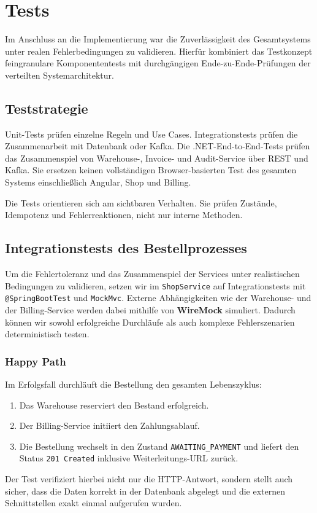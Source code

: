 \documentclass[
  11pt,
  a4paper,
  oneside,
  headings=normal,
  parskip=half,
  DIV=12
]{scrreprt}
\begin{document}
\chapter{Tests}

Im Anschluss an die Implementierung war die Zuverlässigkeit des Gesamtsystems unter realen Fehlerbedingungen zu validieren. Hierfür kombiniert das Testkonzept feingranulare Komponententests mit durchgängigen Ende-zu-Ende-Prüfungen der verteilten Systemarchitektur.

\section{Teststrategie}

Unit-Tests prüfen einzelne Regeln und Use Cases. Integrationstests prüfen die
Zusammenarbeit mit Datenbank oder Kafka. Die .NET-End-to-End-Tests prüfen das Zusammenspiel von Warehouse-, Invoice- und Audit-Service über REST und Kafka. Sie ersetzen keinen vollständigen Browser-basierten Test des gesamten Systems einschließlich Angular, Shop und Billing.

Die Tests orientieren sich am sichtbaren Verhalten. Sie prüfen Zustände,
Idempotenz und Fehlerreaktionen, nicht nur interne Methoden.

\section{Integrationstests des Bestellprozesses}

Um die Fehlertoleranz und das Zusammenspiel der Services unter realistischen Bedingungen zu validieren, setzen wir im \texttt{ShopService} auf Integrationstests mit \texttt{@SpringBootTest} und \texttt{MockMvc}. Externe Abhängigkeiten wie der Warehouse- und der Billing-Service werden dabei mithilfe von \textbf{WireMock} simuliert. Dadurch können wir sowohl erfolgreiche Durchläufe als auch komplexe Fehlerszenarien deterministisch testen.

\subsection{Happy Path}
Im Erfolgsfall durchläuft die Bestellung den gesamten Lebenszyklus:
\begin{enumerate}
    \item Das Warehouse reserviert den Bestand erfolgreich.
    \item Der Billing-Service initiiert den Zahlungsablauf.
    \item Die Bestellung wechselt in den Zustand \texttt{AWAITING\_PAYMENT} und liefert den Status \texttt{201 Created} inklusive Weiterleitungs-URL zurück.
\end{enumerate}
Der Test verifiziert hierbei nicht nur die HTTP-Antwort, sondern stellt auch sicher, dass die Daten korrekt in der Datenbank abgelegt und die externen Schnittstellen exakt einmal aufgerufen wurden.
\end{document}
